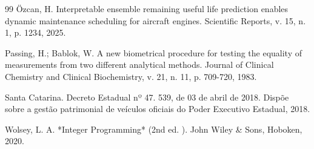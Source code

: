 \documentclass[12pt,a4paper]{article}
\begin{document}
\begin{thebibliography}{99}
 Özcan, H. Interpretable ensemble remaining useful life prediction enables dynamic maintenance scheduling for aircraft engines. Scientific Reports, v. 15, n. 1, p. 1234, 2025.

 Passing, H.; Bablok, W. A new biometrical procedure for testing the equality of measurements from two different analytical methods. Journal of Clinical Chemistry and Clinical Biochemistry, v. 21, n. 11, p. 709-720, 1983.

 Santa Catarina. Decreto Estadual nº 47. 539, de 03 de abril de 2018. Dispõe sobre a gestão patrimonial de veículos oficiais do Poder Executivo Estadual, 2018.

 Wolsey, L. A. *Integer Programming* (2nd ed. ). John Wiley \& Sons, Hoboken, 2020.

\end{thebibliography}
\end{document}
